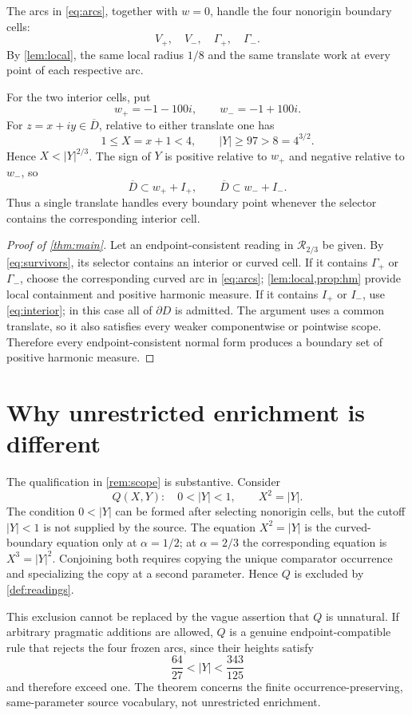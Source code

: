 \documentclass[10pt,reqno]{amsart}
\theoremstyle{definition}
\newcommand{\cR}{\mathcal R}
\begin{document}
The arcs in \cref{eq:arcs}, together with \(w=0\), handle the four
nonorigin boundary cells:
\[
 V_+,\quad V_-,\quad\Gamma_+,\quad\Gamma_-.
\]
By \cref{lem:local}, the same local radius \(1/8\) and the same translate
work at every point of each respective arc.

For the two interior cells, put
\[
 w_+=-1-100i,\qquad w_-=-1+100i.
\tag{5.1}\label{eq:far}
\]
For \(z=x+iy\in\overline D\), relative to either translate one has
\[
 1\leq X=x+1<4,\qquad |Y|\geq97>8=4^{3/2}.
\]
Hence \(X<|Y|^{2/3}\).  The sign of \(Y\) is positive relative to \(w_+\)
and negative relative to \(w_-\), so
\[
 \overline D\subset w_++I_+,
 \qquad
 \overline D\subset w_-+I_-.
\tag{5.2}\label{eq:interior}
\]
Thus a single translate handles every boundary point whenever the selector
contains the corresponding interior cell.

\begin{proof}[Proof of \cref{thm:main}]
Let an endpoint-consistent reading in \(\cR_{2/3}\) be given.  By
\cref{eq:survivors}, its selector contains an interior or curved cell.  If it
contains \(\Gamma_+\) or \(\Gamma_-\), choose the corresponding curved arc in
\cref{eq:arcs}; \cref{lem:local,prop:hm} provide local containment and
positive harmonic measure.  If it contains \(I_+\) or \(I_-\), use
\cref{eq:interior}; in this case all of \(\partial D\) is admitted.  The
argument uses a common translate, so it also satisfies every weaker
componentwise or pointwise scope.  Therefore every endpoint-consistent normal
form produces a boundary set of positive harmonic measure.
\end{proof}

\section{Why unrestricted enrichment is different}

The qualification in \cref{rem:scope} is substantive.  Consider
\[
 Q(X,Y):\quad 0<|Y|<1,\qquad X^2=|Y|.
\tag{6.1}\label{eq:q}
\]
The condition \(0<|Y|\) can be formed after selecting nonorigin cells, but
the cutoff \(|Y|<1\) is not supplied by the source.  The equation
\(X^2=|Y|\) is the curved-boundary equation only at \(\alpha=1/2\); at
\(\alpha=2/3\) the corresponding equation is \(X^3=|Y|^2\).  Conjoining both
requires copying the unique comparator occurrence and specializing the copy
at a second parameter.  Hence \(Q\) is excluded by
\cref{def:readings}.

This exclusion cannot be replaced by the vague assertion that \(Q\) is
unnatural.  If arbitrary pragmatic additions are allowed, \(Q\) is a genuine
endpoint-compatible rule that rejects the four frozen arcs, since their
heights satisfy
\[
 \frac{64}{27}<|Y|<\frac{343}{125}
\]
and therefore exceed one.  The theorem concerns the finite
occurrence-preserving, same-parameter source vocabulary, not unrestricted
enrichment.
\end{document}
